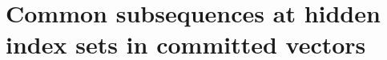 \documentclass[11pt, lettersize, notitlepage, leqno, footskip=0.6cm]{article}
\newcommand{\bFp}{\mathbb{F}_p}
\newcommand{\mc}{\mathcal}
\newcommand{\mr}{\mathrm}
\newcommand{\al}{\alpha}
\newcommand{\what}{\widehat}
\newcommand{\vs}{\vspace{-0.15cm}}
\newcommand{\noin}{\noindent}
\newcommand{\Mod}[1]{\ (\mathrm{mod}\ #1)}
\newtheorem{Lem}[Thm]{Lemma}
\numberwithin{equation}{section}
\begin{document}
\begin{comment} We chop up this polynomial into three parts: $$ f_{_{\prod}}(X) = f_{-}(X) +  f_{{\mr{mid}}}(X)\cdot  X^{n\cdot \deg(f)} +  f_{+}(X)\cdot X^{k\cdot (\deg(f)+1)} $$ such that $$\deg(f_{-}) < k\cdot (\deg(f)+1)\;\,,\;\;\deg(f_{{\mr{mid}}}) < k.$$  This decomposition is unique. The polynomial $f_{-}(X)$ is just the residue $f_{_{\prod}}(X)\Mod{X^{k\cdot \deg(f)}}$. The polynomial $f_{{\mr{mid}}}(X)$ is given by \vs $$ f_{{\mr{mid}}}(X) = \sum\limits_{i=0}^{\deg(f)} (c_i+X)\cdot \what{f}_i(X) \cdot \gamma^{k\cdot i} = \prod\limits_{d\in \mc{D}} (X+d)\cdot \sum\limits_{i\in \mc{I}}\gamma^{k\cdot i} = \chi_{_{\mc{I}}}(\gamma^k)\cdot \prod\limits_{d\in \mc{D}} (X+d). $$  

The Prover sends a commitment to $f_{-}(X)$  along with a proof ($\hyperlink{DegUp}{\tt{ZKPoDegUp}}$) that this is a polynomial of degree less than $k\cdot \deg(f)$. He sends a commitment to $f_{+}(X)\cdot X^{k\cdot (\deg(f)+1)}$ along with a proof that this is a polynomial divisible by $X^{k\cdot \deg(f)}$.

The Prover then proves in zero-knowledge that the polynomial \vs $$f_{_{\prod}}(X) - \big[f_{-}(X) - f_{+}(X)\cdot X^{k\cdot (\deg(f)+1)}\big] $$ coincides with the polynomial \vs $$X^{k\cdot \deg(f)}\cdot \chi_{_{\mc{I}}}(\gamma^k)\cdot \prod\limits_{d\in \mc{D}} (X+d) .$$ 







\begin{Lem} For a polynomial $f(X)\in \bFp[X]$ with derivative $f'(X)$ and elements $\al_1,\cdots,\al_r\in \bFp$, the following are equivalent: \vspace{1mm}

\noin $1.$ $f(X) = \prod\limits_{i=1}^r (X+\al_i)^{n_i}$ for some $\al_1,\cdots,\al_r\in \bFp$ and integers $n_i\geq 1$. \vspace{1mm}

\noin $2.$ $f(X)^{-1}\cdot f'(X) = \sum\limits_{i=1}^r n_i\cdot (X+\al_i)^{-1}$.\end{Lem}


\end{comment}





\section{\fontsize{11}{11}\selectfont  Common subsequences at hidden index sets in committed vectors}
\end{document}
